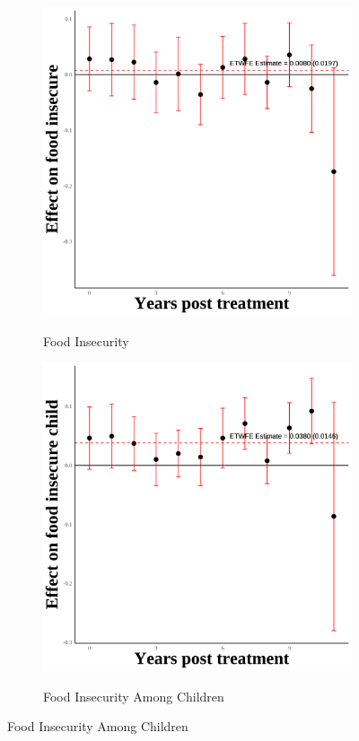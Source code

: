 \documentclass[12pt,english]{article}
\begin{document}
\begin{figure}[H]
  \begin{subfigure}[b]{0.3\textwidth}
    \centering
    \caption{Food Insecurity}
    \includegraphics[width=\linewidth]{figures/plot32-food_insecure_event_study-secgen-hh.png}
    \label{fig:food-insecure-secgen-hh}
  \end{subfigure}
  \hfill
  \begin{subfigure}[b]{0.3\textwidth}
    \centering
    \caption{Food Insecurity Among Children}
    \includegraphics[width=\linewidth]{figures/plot33-food_insecure_child_event_study-secgen-hh.png}
    \label{fig:food-insecure-child-secgen-hh}
  \end{subfigure}

\end{figure}
\end{document}
